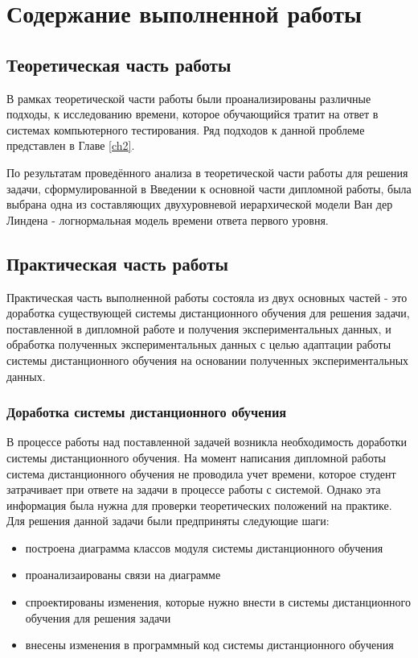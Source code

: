  \chapter{Содержание выполненной работы}

\section{Теоретическая часть работы}

В рамках теоретической части работы были проанализированы различные подходы, к исследованию времени, которое обучающийся тратит на ответ в системах компьютерного тестирования. Ряд подходов к данной проблеме  представлен в Главе \ref{ch2}. 

По результатам проведённого анализа в теоретической части работы для решения задачи, сформулированной в Введении к основной части дипломной работы, была выбрана одна из составляющих двухуровневой иерархической модели Ван дер Линдена - логнор\-мальная модель времени ответа первого уровня.

\section{Практическая часть работы}

Практическая часть выполненной работы состояла из двух основных частей - это доработка существующей системы дистанционного обучения для решения задачи, постав\-ленной в дипломной работе и получения экспериментальных данных, и обработка получен\-ных экспериментальных данных с целью адаптации работы системы дистанционного обуче\-ния на основании полученных экспериментальных данных.

\subsection{Доработка системы дистанционного обучения}

В процессе работы над поставленной задачей возникла необходимость доработки сис\-темы дистанционного обучения. На момент написания дипломной работы система дистан\-ционного обучения не проводила учет времени, которое студент затрачивает при ответе на задачи в процессе работы с системой. Однако эта информация была нужна для проверки теоретических положений на практике. Для решения данной задачи были предприняты следующие шаги:

\begin{itemize}
\item построена диаграмма классов модуля системы дистанционного обучения
\item проанализаированы связи на диаграмме
\item спроектированы изменения, которые нужно внести в системы дистанционного обуче\-ния для решения задачи
\item внесены изменения в программный код системы дистанционного обучения
\end{itemize}


